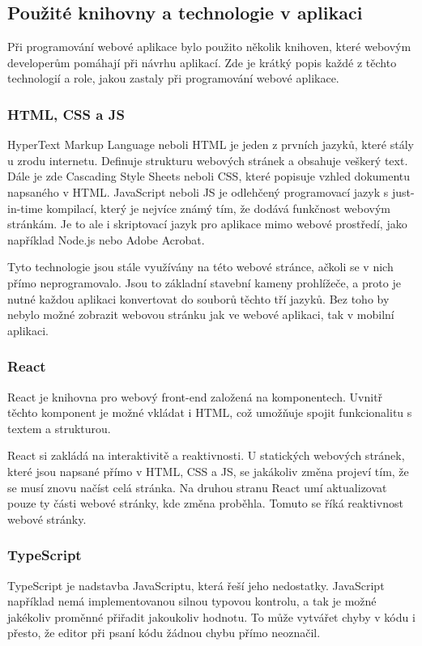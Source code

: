 \subsection{Použité knihovny a technologie v aplikaci}
Při programování webové aplikace bylo použito několik knihoven, které webovým developerům pomáhají při návrhu aplikací. Zde je krátký popis každé z těchto technologií a role, jakou zastaly při programování webové aplikace.

\subsubsection{HTML, CSS a JS}
HyperText Markup Language neboli HTML je jeden z prvních jazyků, které stály u zrodu internetu. Definuje strukturu webových stránek a obsahuje veškerý text. Dále je zde Cascading Style Sheets neboli CSS, které popisuje vzhled dokumentu napsaného v HTML. JavaScript neboli JS je odlehčený programovací jazyk s just-in-time kompilací, který je nejvíce známý tím, že dodává funkčnost webovým stránkám. Je to ale i skriptovací jazyk pro aplikace mimo webové prostředí, jako například Node.js nebo Adobe Acrobat.
\cite{HTMLweb, CSSweb, JSweb}

Tyto technologie jsou stále využívány na této webové stránce, ačkoli se v nich přímo neprogramovalo. Jsou to základní stavební kameny prohlížeče, a proto je nutné každou aplikaci konvertovat do souborů těchto tří jazyků. Bez toho by nebylo možné zobrazit webovou stránku jak ve webové aplikaci, tak v mobilní aplikaci.

\subsubsection{React}\label{sec:React}
React je knihovna pro webový front-end založená na komponentech. Uvnitř těchto komponent je možné vkládat i HTML, což umožňuje spojit funkcionalitu s textem a strukturou.

React si zakládá na interaktivitě a reaktivnosti. U statických webových stránek, které jsou napsané přímo v HTML, CSS a JS, se jakákoliv změna projeví tím, že se musí znovu načíst celá stránka. Na druhou stranu React umí aktualizovat pouze ty části webové stránky, kde změna proběhla. Tomuto se říká reaktivnost webové stránky.
\cite{ReactWeb}

\subsubsection{TypeScript}
TypeScript je nadstavba JavaScriptu, která řeší jeho nedostatky. JavaScript například nemá implementovanou silnou typovou kontrolu, a tak je možné jakékoliv proměnné přiřadit jakoukoliv hodnotu. To může vytvářet chyby v kódu i přesto, že editor při psaní kódu žádnou chybu přímo neoznačil.

